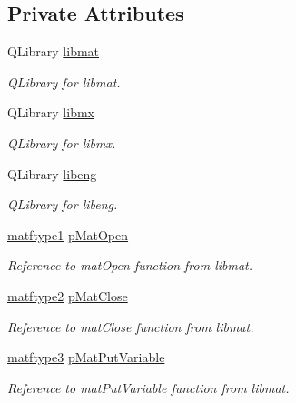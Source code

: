 \subsection*{Private Attributes}
\begin{DoxyCompactItemize}
\item 
Q\-Library \hyperlink{class_c_m_a_t_l_a_b_ad7734632bcf702958838856f46d50f03}{libmat}
\begin{DoxyCompactList}\small\item\em Q\-Library for libmat. \end{DoxyCompactList}\item 
Q\-Library \hyperlink{class_c_m_a_t_l_a_b_ab2aeeea5ac3415555fd88eedaa38b193}{libmx}
\begin{DoxyCompactList}\small\item\em Q\-Library for libmx. \end{DoxyCompactList}\item 
Q\-Library \hyperlink{class_c_m_a_t_l_a_b_af0d1bd46b05565533d973749f5bb9ca3}{libeng}
\begin{DoxyCompactList}\small\item\em Q\-Library for libeng. \end{DoxyCompactList}\item 
\hyperlink{_matlab_library_8h_aca268297c120351425e9c3f63baf7513}{matftype1} \hyperlink{class_c_m_a_t_l_a_b_a6c18b950cb8dbfbba72589e44db1f69e}{p\-Mat\-Open}
\begin{DoxyCompactList}\small\item\em Reference to mat\-Open function from libmat. \end{DoxyCompactList}\item 
\hyperlink{_matlab_library_8h_a13c95ec00742c85c5995ee73f65aa04b}{matftype2} \hyperlink{class_c_m_a_t_l_a_b_a7ec5b3aaa23c3aeac50d7e5e3d0a9dc2}{p\-Mat\-Close}
\begin{DoxyCompactList}\small\item\em Reference to mat\-Close function from libmat. \end{DoxyCompactList}\item 
\hyperlink{_matlab_library_8h_a7160a09ad0d8f7cdf8ddee355882db75}{matftype3} \hyperlink{class_c_m_a_t_l_a_b_ac8ce0e267d00131b74994e825f1bdaa7}{p\-Mat\-Put\-Variable}
\begin{DoxyCompactList}\small\item\em Reference to mat\-Put\-Variable function from libmat. \end{DoxyCompactList}\item 

\end{DoxyCompactItemize}
